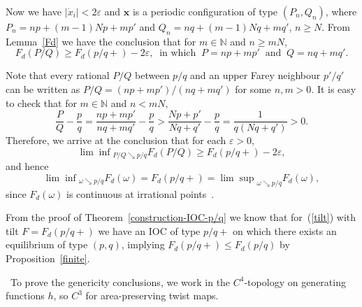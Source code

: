 \documentclass[12pt]{article}
\newcommand{\N}{\mathbb{N}}
\newcommand{\eps}{\varepsilon}
\newcounter{number}
\newcommand{\newsection}[1]{    \section{#1}
                               \setcounter{equation}{0}
                                \setcounter{number}{1} }
\newcommand{\refer}[1]{~(\ref{#1})}
\newcommand{\xbf}{{\mathbf{x}}}
\begin{document}
Now we have $|\dot{x}_i|< 2\eps$ and $\xbf$ is a periodic configuration of type $(P_n,Q_n)$, where
$P_n=np+(m-1)Np+mp'$ and $Q_n=nq+(m-1)Nq+mq'$, $n\geq N$. From Lemma~\ref{Fd} we have the conclusion that  for $m\in\N$ and $n\geq mN$,
$$
F_d(P/Q)\geq F_d(p/q+)-2\eps,\ \mbox{ in which }\ P=np+mp'\ \mbox{ and } \ Q=nq+mq'.
$$

Note that every rational $P/Q$ between $p/q$ and an upper Farey neighbour $p'/q'$ can be written as $P/Q = (np+mp')/(nq+mq')$ for some $n,m >0$. It is easy to check that for $m\in\N$ and $n<mN$,
$$
\frac{P}{Q}-\frac{p}{q}=\frac{np+mp'}{nq+mq'}-\frac{p}{q}>
\frac{Np+p'}{Nq+q'}-\frac{p}{q}=\frac{1}{q(Nq+q')}>0.
$$
Therefore, we arrive at the conclusion that for each $\eps>0$,
$$
{\lim\inf}_{P/Q\searrow p/q}F_d(P/Q)\geq F_d(p/q+)-2\eps,
$$
and hence
$$
{\lim\inf}_{\omega\searrow p/q}F_d(\omega)=F_d(p/q+)={\lim\sup}_{\omega\searrow p/q}F_d(\omega),
$$
since $F_d(\omega)$ is continuous at irrational points~\cite{QW1,WMWQ}.

From the proof of Theorem~\ref{construction-IOC-p/q} we know that for\refer{tilt} with tilt $F=F_d(p/q+)$ we have an IOC of type $p/q+$ on which there exists an equilibrium of type $(p,q)$, implying $F_d(p/q+)\leq F_d(p/q)$ by Proposition~\ref{finite}.



\vspace{2mm}



\
To prove the genericity conclusions, we work in the $C^4$-topology on generating functions $h$, so $C^3$ for area-preserving twist maps.
\end{document}
